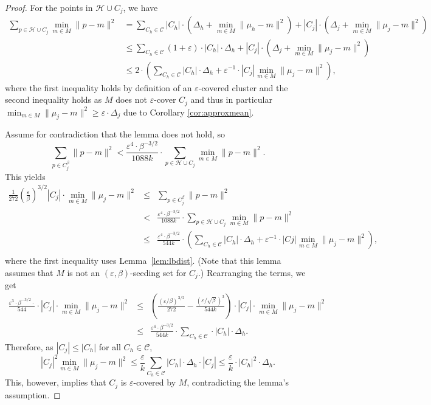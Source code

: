 \documentclass[10pt,a4paper]{amsart}
\providecommand{\cal}{\mathcal}
\begin{document}
\begin{proof}
For the points in $\mathcal{H}\cup C_j$, we have 
\begin{align*}
\label{eq:sample1}
  \sum_{p\in \mathcal{H}\cup C_j}\min_{m\in M}\|p-m\|^2 & = \sum_{C_h\in \cal C}  |C_h| \cdot \left(\Delta_h + \min_{m\in M}\|\mu_h - m\|^2\right) + |C_j|\cdot(\Delta_j + \min_{m\in M}\|\mu_j-m\|^2) \\
  &\leq \sum_{C_h\in \cal C} (1+\varepsilon) \cdot |C_h|\cdot\Delta_h + |C_j|\cdot(\Delta_j + \min_{m\in M}\|\mu_j-m\|^2) \\
  &\leq  2\cdot \left(\sum_{C_h\in \cal C} |C_h|\cdot\Delta_h  +\varepsilon^{-1}\cdot |C_j| \min_{m\in M}\|\mu_j-m\|^2\right),
\end{align*}
where the first inequality holds by definition of an $\varepsilon$-covered cluster and the second inequality holds as $M$ does not $\varepsilon$-cover $C_j$ and thus in particular $\min_{m\in M}\|\mu_j-m\|^2 \geq \varepsilon\cdot \Delta_j$ due to Corollary \ref{cor:approxmean}.

Assume for contradiction that the lemma does not hold, so
$$
\sum_{p\in C_j^\beta}\|p-m\|^2 <  \frac{\varepsilon^4 \cdot \beta^{-3/2}}{1088k}\cdot \sum_{p\in \mathcal{H}\cup C_j}\min_{m\in M}\|p-m\|^2.
$$
This yields
\begin{eqnarray*}
\frac{1}{272}\left(\frac{\varepsilon}{\beta}\right)^{3/2} |C_j| \cdot \min_{m\in M}\|\mu_j-m\|^2
&\le& \sum_{p\in C_j^\beta}\|p-m\|^2 \\
& < & \frac{\varepsilon^4 \cdot \beta^{-3/2}}{1088k}\cdot \sum_{p\in \mathcal{H}\cup C_j}\min_{m\in M}\|p-m\|^2\\
&\le&  \frac{\varepsilon^4 \cdot \beta^{-3/2}}{544 k}\cdot \left(\sum_{C_h\in \cal C}  |C_h|\cdot\Delta_h  +\varepsilon^{-1}\cdot |Cj| \min_{m\in M}\|\mu_j-m\|^2\right), \\
\end{eqnarray*}
where the first inequality uses Lemma~\ref{lem:lbdist}. (Note that this lemma assumes that $M$
is not an $(\varepsilon,\beta)$-seeding set for $C_j$.) Rearranging the terms, we get
\begin{eqnarray*}
\frac{\varepsilon^3\cdot \beta^{-3/2}\cdot}{544}\cdot |C_j|\cdot\min_{m\in M}\|\mu_j-m\|^2
&\le&\left(\frac{(\varepsilon/\beta)^{3/2}}{272}-\frac{(\varepsilon/\sqrt{\beta})^{3}}{544k}\right)\cdot|C_j|\cdot\min_{m\in M}\|\mu_j-m\|^2 \\
&\leq& \frac{\varepsilon^4 \cdot \beta^{-3/2}}{544k}\cdot \sum_{C_h\in \cal C}\cdot  |C_h|\cdot\Delta_h.
\end{eqnarray*}
Therefore, as $|C_j|\leq |C_h|$ for all $C_h\in {\cal C}$,
$$
|C_j|^2 \min_{m\in M}\|\mu_j-m\|^2 \leq \frac{\varepsilon}{k} \sum_{C_h\in \cal C}  |C_h|\cdot\Delta_h \cdot |C_j| \leq \frac{\varepsilon}{k}\cdot |C_h|^2\cdot\Delta_h.
$$
This, however, implies that $C_j$ is $\varepsilon$-covered by $M$, contradicting the lemma's assumption.
\end{proof}
\end{document}
